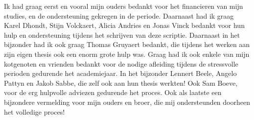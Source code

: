 Ik had graag eerst en vooral mijn ouders bedankt voor het financieren van mijn
studies, en de ondersteuning gekregen in de periode. Daarnaast had ik graag
Karel Dhondt, Stijn Volckaert, Alicia Andries en Jonas Vinck bedankt voor hun
hulp en ondersteuning tijdens het schrijven van deze scriptie. Daarnaast in het
bijzonder had ik ook graag Thomas Gruyaert bedankt, die tijdens het werken aan
zijn eigen thesis ook een enorm grote hulp was. Graag had ik ook enkele van
mijn kotgenoten en vrienden bedankt voor de nodige afleiding tijdens de
stressvolle perioden gedurende het academiejaar. In het bijzonder Lennert
Beele, Angelo Pattyn en Jakob Sabbe, die zelf ook aan hun thesis werkten! Ook
Sam Boeve, voor de erg hulpvolle adviezen gedurende het proces. Ook als laatste
een bijzondere vermelding voor mijn ouders en broer, die mij ondersteunden
doorheen het volledige proces!